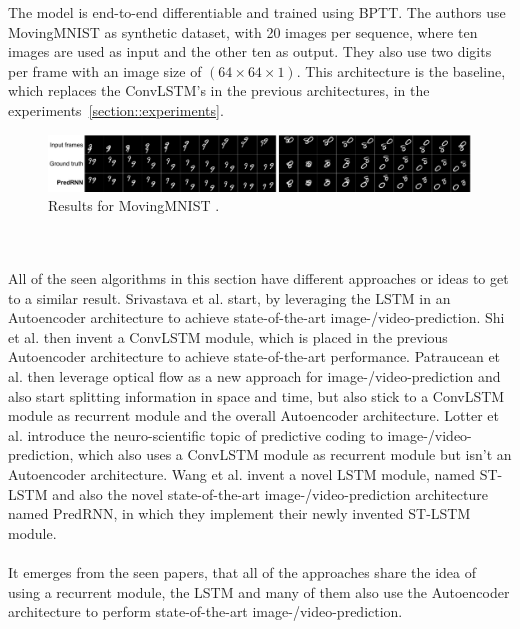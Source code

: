   The model is end-to-end differentiable and trained using BPTT. The authors use MovingMNIST as synthetic dataset, with 20 images per sequence, where ten images
  are used as input and the other ten as output. They also use two digits per frame with an image size of $(64 \times 64 \times 1)$.
  This architecture is the baseline, which replaces the ConvLSTM's in the previous architectures, in the experiments~\ref{section::experiments}.
  \begin{figure}[H]
   \includegraphics[width=1.0\textwidth]{../Images/predrnn_mnist.png}
   \centering
   \caption{Results for MovingMNIST \cite{Wang2017}.}
   \label{fig:predrnn_mnist}
  \end{figure}\noindent
\\\\
All of the seen algorithms in this section have different approaches or ideas to get to a similar result.
Srivastava et al. \cite{Srivastava2015} start, by leveraging the LSTM in an Autoencoder architecture to achieve state-of-the-art image-/video-prediction.
Shi et al. \cite{Shi2015} then invent a ConvLSTM module, which is placed in the previous Autoencoder architecture to achieve state-of-the-art performance.
Patraucean et al. \cite{Patraucean2015} then leverage optical flow as a new approach for image-/video-prediction and also start splitting information in space and time, but also stick to a ConvLSTM module as recurrent module and the overall Autoencoder architecture.
Lotter et al. \cite{Lotter2016} introduce the neuro-scientific topic of
predictive coding to image-/video-prediction, which also uses a ConvLSTM module as recurrent module but isn't an Autoencoder architecture.
Wang et al. \cite{Wang2017} invent a novel LSTM module, named ST-LSTM and also the novel state-of-the-art image-/video-prediction architecture named PredRNN, in
which they implement their newly invented ST-LSTM module.
\\\\
It emerges from the seen papers, that all of the approaches share
the idea of using a recurrent module, the LSTM and many of them also use the Autoencoder architecture to perform state-of-the-art image-/video-prediction.